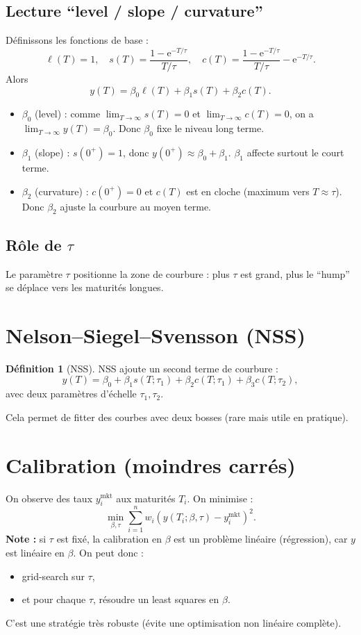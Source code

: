 \documentclass[11pt,a4paper]{report}
\newcommand{\ee}{\mathrm{e}}
\newcommand{\1}{\mathbbm{1}}
\theoremstyle{definition}
\newtheorem{definition}{Définition}[chapter]
\theoremstyle{plain}
\theoremstyle{remark}
\begin{document}
\subsection{Lecture ``level / slope / curvature''}
Définissons les fonctions de base :
\[
\ell(T)=1,\quad
s(T)=\frac{1-\ee^{-T/\tau}}{T/\tau},\quad
c(T)=\frac{1-\ee^{-T/\tau}}{T/\tau}-\ee^{-T/\tau}.
\]
Alors
\[
y(T)=\beta_0 \ell(T)+\beta_1 s(T)+\beta_2 c(T).
\]
\begin{itemize}
  \item $\beta_0$ (level) : comme $\lim_{T\to\infty} s(T)=0$ et $\lim_{T\to\infty} c(T)=0$,
  on a $\lim_{T\to\infty} y(T)=\beta_0$. Donc $\beta_0$ fixe le niveau long terme.
  \item $\beta_1$ (slope) : $s(0^+)=1$, donc $y(0^+)\approx \beta_0+\beta_1$. $\beta_1$ affecte surtout le court terme.
  \item $\beta_2$ (curvature) : $c(0^+)=0$ et $c(T)$ est en cloche (maximum vers $T\approx \tau$).
  Donc $\beta_2$ ajuste la courbure au moyen terme.
\end{itemize}

\subsection{Rôle de $\tau$}
Le paramètre $\tau$ positionne la zone de courbure :
plus $\tau$ est grand, plus le ``hump'' se déplace vers les maturités longues.

\section{Nelson--Siegel--Svensson (NSS)}
\begin{definition}[NSS]
NSS ajoute un second terme de courbure :
\[
y(T)=\beta_0 + \beta_1 s(T;\tau_1) + \beta_2 c(T;\tau_1) + \beta_3 c(T;\tau_2),
\]
avec deux paramètres d'échelle $\tau_1,\tau_2$.
\end{definition}
Cela permet de fitter des courbes avec deux bosses (rare mais utile en pratique).

\section{Calibration (moindres carrés)}
\label{sec:ns_calib}

On observe des taux $y_i^{\mathrm{mkt}}$ aux maturités $T_i$.
On minimise :
\[
\min_{\beta,\tau} \sum_{i=1}^n w_i\left(y(T_i;\beta,\tau)-y_i^{\mathrm{mkt}}\right)^2.
\]
\textbf{Note :} si $\tau$ est fixé, la calibration en $\beta$ est un problème linéaire (régression),
car $y$ est linéaire en $\beta$.
On peut donc :
\begin{itemize}
  \item grid-search sur $\tau$,
  \item et pour chaque $\tau$, résoudre un least squares en $\beta$.
\end{itemize}
C'est une stratégie très robuste (évite une optimisation non linéaire complète).
\end{document}

